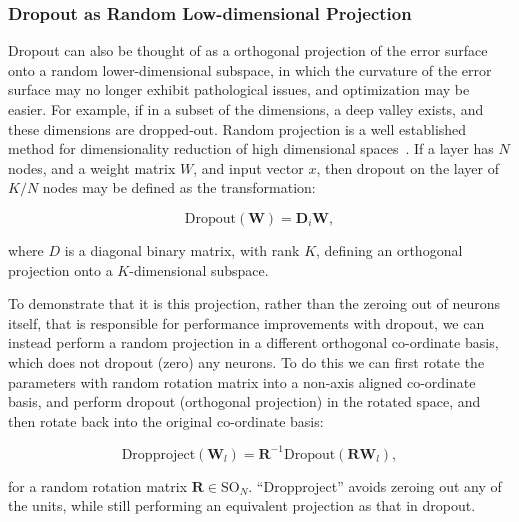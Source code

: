\documentclass[thesis]{subfiles}
\begin{document}
\subsubsection{Dropout as Random Low-dimensional Projection}
Dropout can also be thought of as a orthogonal projection of the error surface onto a random lower-dimensional subspace, in which the curvature of the error surface may no longer exhibit pathological issues, and optimization may be easier. For example, if in a subset of the dimensions, a deep valley exists, and these dimensions are dropped-out. Random projection is a well established method for dimensionality reduction of high dimensional spaces~\citep{kaski1998dimensionality,fodor2002survey}.
If a layer has $N$ nodes, and a weight matrix $W$, and input vector $x$, then dropout on the layer of $K/N$ nodes may be defined as the transformation:

\begin{equation}
\textrm{Dropout}(\mathbf{W}) = \mathbf{D}_{i} \mathbf{W},
\end{equation}

where $D$ is a diagonal binary matrix, with rank $K$, defining an orthogonal projection onto a $K$-dimensional subspace. 

To demonstrate that it is this projection, rather than the zeroing out of neurons itself, that is responsible for performance improvements with dropout, we can instead perform a random projection in a different orthogonal co-ordinate basis, which does not dropout (zero) any neurons. To do this we can first rotate the parameters with random rotation matrix into a non-axis aligned co-ordinate basis, and perform dropout (orthogonal projection) in the rotated space, and then rotate back into the original co-ordinate basis:

\begin{equation}
\textrm{Dropproject}(\mathbf{W}_l) = \mathbf{R}^{-1}\textrm{Dropout}(\mathbf{R} \mathbf{W}_l),
\end{equation}

for a random rotation matrix $\mathbf{R}\in \textrm{SO}_N$. ``Dropproject'' avoids zeroing out any of the units, while still performing an equivalent projection as that in dropout.
\end{document}
